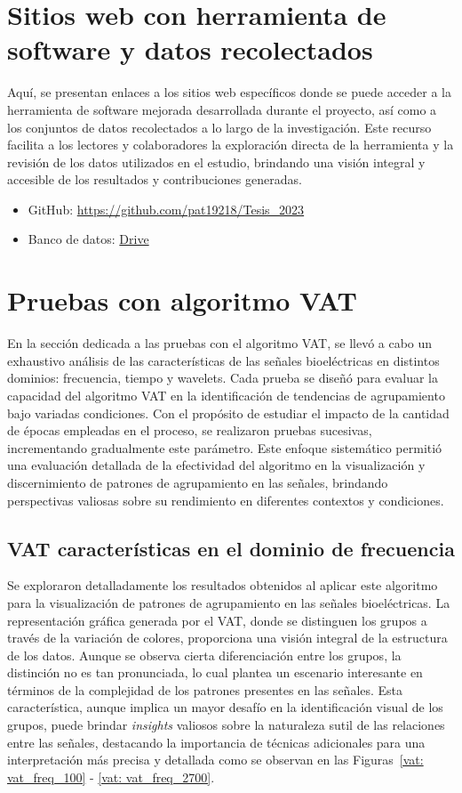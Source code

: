 \section{Sitios web con herramienta de software y datos recolectados}
Aquí, se presentan enlaces a los sitios web específicos donde se puede acceder a la herramienta de software mejorada desarrollada durante el proyecto, así como a los conjuntos de datos recolectados a lo largo de la investigación. Este recurso facilita a los lectores y colaboradores la exploración directa de la herramienta y la revisión de los datos utilizados en el estudio, brindando una visión integral y accesible de los resultados y contribuciones generadas.

\begin{itemize}
    \item GitHub: \url{https://github.com/pat19218/Tesis_2023}
    \item Banco de datos: \href{https://drive.google.com/drive/u/1/folders/1aTNy2e-KkGNi9qVemx3-I05KnxCGLlTQ}{Drive}
\end{itemize}

\section{Pruebas con algoritmo VAT}
En la sección dedicada a las pruebas con el algoritmo VAT, se llevó a cabo un exhaustivo análisis de las características de las señales bioeléctricas en distintos dominios: frecuencia, tiempo y wavelets. Cada prueba se diseñó para evaluar la capacidad del algoritmo VAT en la identificación de tendencias de agrupamiento bajo variadas condiciones. Con el propósito de estudiar el impacto de la cantidad de épocas empleadas en el proceso, se realizaron pruebas sucesivas, incrementando gradualmente este parámetro. Este enfoque sistemático permitió una evaluación detallada de la efectividad del algoritmo en la visualización y discernimiento de patrones de agrupamiento en las señales, brindando perspectivas valiosas sobre su rendimiento en diferentes contextos y condiciones.

\subsection{VAT características en el dominio de frecuencia}
Se exploraron detalladamente los resultados obtenidos al aplicar este algoritmo para la visualización de patrones de agrupamiento en las señales bioeléctricas. La representación gráfica generada por el VAT, donde se distinguen los grupos a través de la variación de colores, proporciona una visión integral de la estructura de los datos. Aunque se observa cierta diferenciación entre los grupos, la distinción no es tan pronunciada, lo cual plantea un escenario interesante en términos de la complejidad de los patrones presentes en las señales. Esta característica, aunque implica un mayor desafío en la identificación visual de los grupos, puede brindar \textit{insights} valiosos sobre la naturaleza sutil de las relaciones entre las señales, destacando la importancia de técnicas adicionales para una interpretación más precisa y detallada como se observan en las Figuras~\ref{vat: vat_freq_100} - \ref{vat: vat_freq_2700}.

